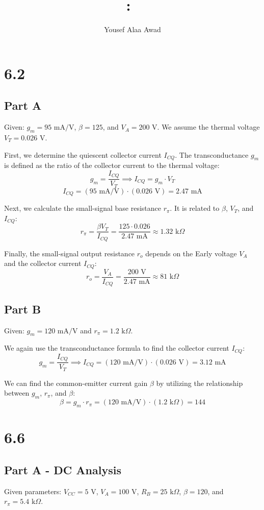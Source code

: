 \documentclass{article}
\title{
    \vspace{2in}
    \textmd{\textbf{\hmwkClass:\ \hmwkTitle}}\\
    \normalsize\vspace{0.1in}
    \vspace{3in}
}
\author{Yousef Alaa Awad}
\begin{document}
\maketitle
\pagebreak

\section{6.2}
\subsection{Part A}
Given: $g_m = 95 \text{ mA/V}$, $\beta = 125$, and $V_A = 200 \text{ V}$. We assume the thermal voltage $V_T = 0.026 \text{ V}$.

First, we determine the quiescent collector current $I_{CQ}$. The transconductance $g_m$ is defined as the ratio of the collector current to the thermal voltage:
$$ g_m = \frac{I_{CQ}}{V_T} \implies I_{CQ} = g_m \cdot V_T $$
$$ I_{CQ} = (95 \text{ mA/V}) \cdot (0.026 \text{ V}) = 2.47 \text{ mA} $$

Next, we calculate the small-signal base resistance $r_\pi$. It is related to $\beta$, $V_T$, and $I_{CQ}$:
$$ r_\pi = \frac{\beta V_T}{I_{CQ}} = \frac{125 \cdot 0.026}{2.47 \text{ mA}} \approx 1.32 \text{ k}\Omega $$

Finally, the small-signal output resistance $r_o$ depends on the Early voltage $V_A$ and the collector current $I_{CQ}$:
$$ r_o = \frac{V_A}{I_{CQ}} = \frac{200 \text{ V}}{2.47 \text{ mA}} \approx 81 \text{ k}\Omega $$

\subsection{Part B}
Given: $g_m = 120 \text{ mA/V}$ and $r_\pi = 1.2 \text{ k}\Omega$.

We again use the transconductance formula to find the collector current $I_{CQ}$:
$$ g_m = \frac{I_{CQ}}{V_T} \implies I_{CQ} = (120 \text{ mA/V}) \cdot (0.026 \text{ V}) = 3.12 \text{ mA} $$

We can find the common-emitter current gain $\beta$ by utilizing the relationship between $g_m$, $r_\pi$, and $\beta$:
$$ \beta = g_m \cdot r_\pi = (120 \text{ mA/V}) \cdot (1.2 \text{ k}\Omega) = 144 $$

\pagebreak
\section{6.6}
\subsection{Part A - DC Analysis}
Given parameters: $V_{CC} = 5 \text{ V}$, $V_A = 100 \text{ V}$, $R_B = 25 \text{ k}\Omega$, $\beta = 120$, and $r_\pi = 5.4 \text{ k}\Omega$.
\end{document}
